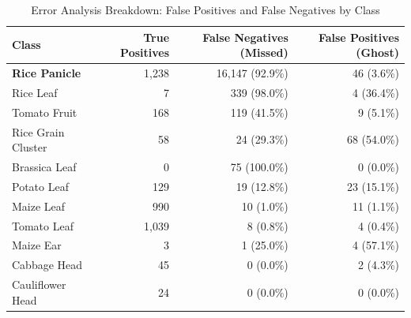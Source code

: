 \documentclass{article}
\begin{document}
\begin{table}[htbp]
  \centering
  \caption{Error Analysis Breakdown: False Positives and False Negatives by Class}
  \label{tab:error_analysis}
  \begin{tabular}{lrrr}
    \toprule
    \textbf{Class} & \textbf{True Positives} & \textbf{False Negatives (Missed)} & \textbf{False Positives (Ghost)} \\
    \midrule
    \textbf{Rice Panicle} & 1,238 & 16,147 (92.9\%) & 46 (3.6\%) \\
    Rice Leaf & 7 & 339 (98.0\%) & 4 (36.4\%) \\
    Tomato Fruit & 168 & 119 (41.5\%) & 9 (5.1\%) \\
    Rice Grain Cluster & 58 & 24 (29.3\%) & 68 (54.0\%) \\
    Brassica Leaf & 0 & 75 (100.0\%) & 0 (0.0\%) \\
    Potato Leaf & 129 & 19 (12.8\%) & 23 (15.1\%) \\
    Maize Leaf & 990 & 10 (1.0\%) & 11 (1.1\%) \\
    Tomato Leaf & 1,039 & 8 (0.8\%) & 4 (0.4\%) \\
    Maize Ear & 3 & 1 (25.0\%) & 4 (57.1\%) \\
    Cabbage Head & 45 & 0 (0.0\%) & 2 (4.3\%) \\
    Cauliflower Head & 24 & 0 (0.0\%) & 0 (0.0\%) \\
    \bottomrule
  \end{tabular}
\end{table}
\end{document}
